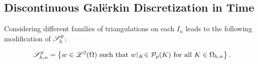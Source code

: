 \newpage
\subsection{Discontinuous Galërkin Discretization in Time} \label{sec:full_discretization}

Considering different families of triangulations on each $I_n$ leads to the following modification of $\mathscr{S}_h^p$:
\begin{definition}[$\SpaceSolution_{h, n}^p$]
    \begin{align}
        \mathscr{S}_{h, n}^p = \left\{ w \in \mathscr{L}^{2}(\Omega) \text{ such that } w \!\!\restriction_{K} \in \mathcal{P}_{p}(K) \text{ for all } K \in \Omega_{h, n} \right\}.
    \end{align}
\end{definition}

